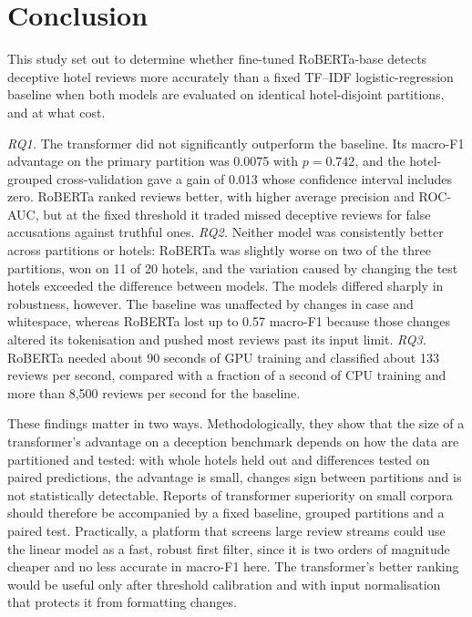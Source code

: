 \section{Conclusion}
\label{sec:conclusion}
This study set out to determine whether fine-tuned RoBERTa-base detects deceptive hotel reviews more accurately than a fixed TF--IDF logistic-regression baseline when both models are evaluated on identical hotel-disjoint partitions, and at what cost.

\emph{RQ1.} The transformer did not significantly outperform the baseline. Its macro-F1 advantage on the primary partition was 0.0075 with $p=0.742$, and the hotel-grouped cross-validation gave a gain of 0.013 whose confidence interval includes zero. RoBERTa ranked reviews better, with higher average precision and ROC-AUC, but at the fixed threshold it traded missed deceptive reviews for false accusations against truthful ones. \emph{RQ2.} Neither model was consistently better across partitions or hotels: RoBERTa was slightly worse on two of the three partitions, won on 11 of 20 hotels, and the variation caused by changing the test hotels exceeded the difference between models. The models differed sharply in robustness, however. The baseline was unaffected by changes in case and whitespace, whereas RoBERTa lost up to 0.57 macro-F1 because those changes altered its tokenisation and pushed most reviews past its input limit. \emph{RQ3.} RoBERTa needed about 90 seconds of GPU training and classified about 133 reviews per second, compared with a fraction of a second of CPU training and more than 8,500 reviews per second for the baseline.

These findings matter in two ways. Methodologically, they show that the size of a transformer's advantage on a deception benchmark depends on how the data are partitioned and tested: with whole hotels held out and differences tested on paired predictions, the advantage is small, changes sign between partitions and is not statistically detectable. Reports of transformer superiority on small corpora should therefore be accompanied by a fixed baseline, grouped partitions and a paired test. Practically, a platform that screens large review streams could use the linear model as a fast, robust first filter, since it is two orders of magnitude cheaper and no less accurate in macro-F1 here. The transformer's better ranking would be useful only after threshold calibration and with input normalisation that protects it from formatting changes.

